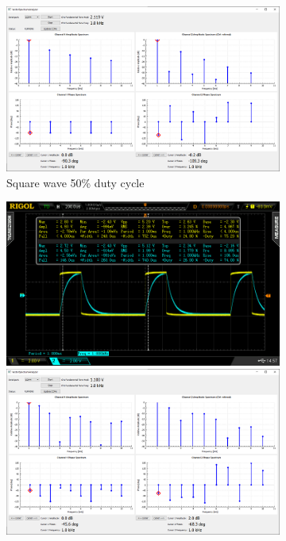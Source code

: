 \documentclass[notitlepage, a4paper, 11pt]{article}
\begin{document}
\begin{figure}[H]
\begin{subfigure}[][][t]{0.23\textwidth}
			\includegraphics[width=\textwidth, trim=10 80 555 100, clip]{../img/Circuit1/dut50}
			\caption{Square wave 50\% duty cycle}
		\end{subfigure}
		\hfill
		\begin{subfigure}[][][t]{0.23\textwidth}
			\includegraphics[width=\textwidth, trim=85 50 112 45, clip]{../img/osc/DS2_QuickPrint3.png}
			\includegraphics[width=\textwidth, trim=10 80 555 100, clip]{../img/Circuit1/dut25}

\end{subfigure}
\end{figure}
\end{document}
